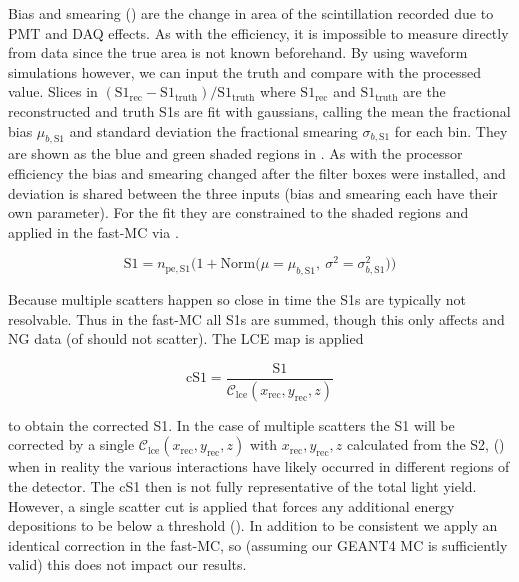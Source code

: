 Bias and smearing () are the change in area of the scintillation recorded due to PMT and DAQ
effects.  As with the efficiency, it is impossible to measure directly from data since the true area is not known beforehand.  By using
waveform simulations however, we can input
the truth and compare with the processed value.  Slices in $(\mathrm{S1_{rec}} - \mathrm{S1_{truth}}) / \mathrm{S1_{truth}}$ where
$\mathrm{S1_{rec}}$ and $\mathrm{S1_{truth}}$ are the reconstructed and truth S1s are fit with gaussians, calling the mean
the fractional bias $\mu_{b, \mathrm{S1}}$ and standard deviation the fractional smearing $\sigma_{b, \mathrm{S1}}$ for each bin.  They
are shown as the blue and green shaded regions in
.  As with the processor efficiency the bias and smearing changed after
the filter boxes were installed, and deviation is shared between the three inputs (bias and smearing each have their own parameter).  For
the fit they are constrained to the shaded regions and applied
in the fast-MC via .

\begin{equation}
\mathrm{S1} = n_{\mathrm{pe,S1}} \Big( 1 + \mathrm{Norm} \big( \mu = \mu_{b, \mathrm{S1}},\ \sigma^2 = \sigma_{b, \mathrm{S1}}^2 \big)
\Big)
\label{eq:er_nr_calibrations_parameter_determ_det_phys_s1_bias_smear}
\end{equation}

Because multiple scatters happen so close in time the S1s are typically not resolvable.  Thus in the fast-MC all S1s are summed, though
this only affects \ambe and NG data (\betadecay of  should not scatter).  The LCE map is applied

\begin{equation}
\mathrm{cS1} = \frac{\mathrm{S1}}{\mathcal{C}_{\mathrm{lce}}(x_{\mathrm{rec}}, y_{\mathrm{rec}}, z)}
\label{eq:er_nr_calibrations_parameter_determ_det_phys_cs1}
\end{equation}

\noindent to obtain the corrected S1.  In the case of multiple scatters the S1 will be corrected by a single
$\mathcal{C}_{\mathrm{lce}}(x_{\mathrm{rec}}, y_{\mathrm{rec}}, z)$ with $x_{\mathrm{rec}}, y_{\mathrm{rec}}, z$ calculated from the S2,
() when in reality the various interactions have
likely occurred in different regions of the detector.  The cS1 then is not fully representative of the total light yield.  However,
a single scatter cut is applied that forces any additional energy depositions to be below a threshold
().  In addition to be
consistent we apply an identical correction in the fast-MC, so (assuming our GEANT4 MC is sufficiently valid) this does not impact our
results.

